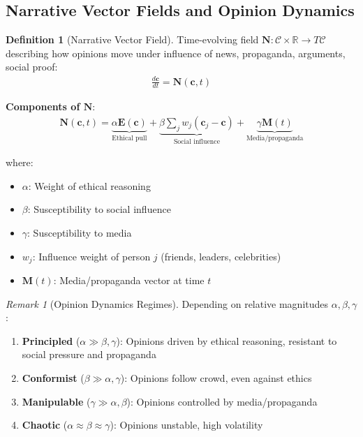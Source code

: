 \documentclass[11pt,a4paper]{article}
\theoremstyle{definition}
\newtheorem{definition}{Definition}[section]
\theoremstyle{remark}
\newtheorem{remark}{Remark}[section]
\newcommand{\RR}{\mathbb{R}}
\newcommand{\CC}{\mathcal{C}}
\newcommand{\EE}{\mathbf{E}}
\newcommand{\cc}{\mathbf{c}}
\begin{document}
\begin{small}
\begin{enumerate}
\subsection{Narrative Vector Fields and Opinion Dynamics}

\begin{definition}[Narrative Vector Field]
Time-evolving field \(\mathbf{N}: \CC \times \RR \to T\CC\) describing how opinions move under influence of news, propaganda, arguments, social proof:
\begin{align}
\frac{d\cc}{dt} = \mathbf{N}(\cc, t)
\end{align}

\textbf{Components of \(\mathbf{N}\)}:
\begin{align}
\mathbf{N}(\cc, t) = \underbrace{\alpha \EE(\cc)}_{\text{Ethical pull}} + \underbrace{\beta \sum_j w_j (\cc_j - \cc)}_{\text{Social influence}} + \underbrace{\gamma \mathbf{M}(t)}_{\text{Media/propaganda}}
\end{align}

where:
\begin{itemize}
    \item \(\alpha\): Weight of ethical reasoning
    \item \(\beta\): Susceptibility to social influence
    \item \(\gamma\): Susceptibility to media
    \item \(w_j\): Influence weight of person \(j\) (friends, leaders, celebrities)
    \item \(\mathbf{M}(t)\): Media/propaganda vector at time \(t\)
\end{itemize}
\end{definition}

\begin{remark}[Opinion Dynamics Regimes]
Depending on relative magnitudes \(\alpha, \beta, \gamma\):

\begin{enumerate}
    \item \textbf{Principled} (\(\alpha \gg \beta, \gamma\)): Opinions driven by ethical reasoning, resistant to social pressure and propaganda
    \item \textbf{Conformist} (\(\beta \gg \alpha, \gamma\)): Opinions follow crowd, even against ethics
    \item \textbf{Manipulable} (\(\gamma \gg \alpha, \beta\)): Opinions controlled by media/propaganda
    \item \textbf{Chaotic} (\(\alpha \approx \beta \approx \gamma\)): Opinions unstable, high volatility
\end{enumerate}


\end{remark}
\end{enumerate}
\end{small}
\end{document}
